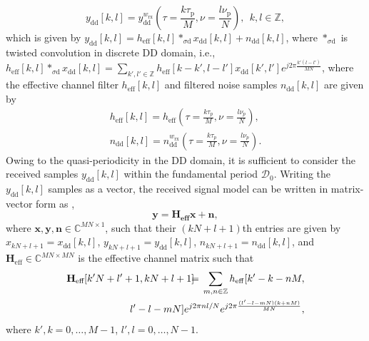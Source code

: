 \vspace{0mm}
\begin{equation}
y_{\mathrm{dd}}[k,l]=y_{\mathrm{dd}}^{w_{\mathrm{rx}}}\left(\tau=\frac{k\tau_{\mathrm p}}{M},\nu=\frac{l\nu_{\mathrm p}}{N}\right), \ \ k,l\in\mathbb{Z},
\end{equation} 
which is given by
$y_{\mathrm{dd}}[k,l]=h_{\mathrm{eff}}[k,l]*_{\sigma\text{d}}x_{\mathrm{dd}}[k,l]+n_{\mathrm{dd}}[k,l]$,
where $*_{\sigma\text{d}}$ is twisted convolution in discrete DD domain, i.e., 
$h_{\mathrm{eff}}[k,l]*_{\sigma\text{d}}x_{\mathrm{dd}}[k,l] = \sum_{k',l'\in\mathbb{Z}}h_{\mathrm{eff}}[k-k',l-l']x_{\mathrm{dd}}[k',l'] e^{j2\pi\frac{k'(l-l')}{MN}}$, where the effective channel filter $h_{\mathrm{eff}}[k,l]$ and filtered noise samples $n_{\mathrm{dd}}[k,l]$ are given by
\begin{align}
h_{\text{eff}}[k,l]=h_{\text{eff}}\left(\tau=\frac{k\tau_{p}}{M},\nu=\frac{l\nu_{p}}{N}\right), \label{discr2} \\ 
n_{\text{dd}}[k,l]=n_{\text{dd}}^{w_{\mathrm{rx}}}\left(\tau=\frac{k\tau_{p}}{M},\nu=\frac{l\nu_{p}}{N}\right).
\label{discr3}
\end{align}
Owing to the quasi-periodicity in the DD domain, it is sufficient to consider the received samples $y_{\mathrm{dd}}[k,l]$ within the fundamental period $\mathcal{D}_0$. Writing the $y_{\mathrm{dd}}[k,l]$ samples as a vector, the received signal model can be written in matrix-vector form as \cite{zak_otfs1},\cite{zak_otfs2}
\begin{equation}
\mathbf{y}=\mathbf{H_\text{eff}x}+\mathbf{n},
\label{sys_mod}
\end{equation}
where $\mathbf{x,y,n} \in\mathbb{C}^{MN\times 1}$, such that their $(kN+l+1)$th entries are given by $x_{kN+l+1}=x_{\mathrm{dd}}[k,l]$, $y_{kN+l+1}=y_{\mathrm{dd}}[k,l]$, $n_{kN+l+1}=n_{\mathrm{dd}}[k,l]$, and $\mathbf{H}_{\text{eff}}\in\mathbb{C}^{MN\times MN}$ is the effective channel matrix such that
\vspace{-1mm}
\begin{eqnarray}
\mathbf{H}_\text{eff}[k'N+l'+1,kN+l+1] & \hspace{-2mm} = & \hspace{-2mm} \sum_{m,n\in\mathbb{Z}}h_{\mathrm{eff}}[k'-k-nM, \nonumber \\
& \hspace{-45mm} & \hspace{-35mm} l'-l-mN]e^{j2\pi nl/N}e^{j2\pi\frac{(l'-l-mN)(k+nM)}{MN}},
\label{eqn_channel_matrix}
\vspace{-4mm}
\end{eqnarray}
where $k',k=0,\ldots,M-1$, $l',l=0,\ldots,N-1$. 

